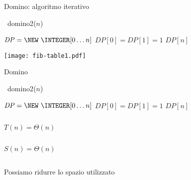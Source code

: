\begin{frame}[fragile]{Domino: algoritmo iterativo}

\vspace{-9pt}

\begin{Procedure}
\caption[A]{\INTEGER\ \textsf{domino2}(\INTEGER $n$)}
  $\mathit{DP} = \NEW\ \INTEGER[0 \ldots n]$\;
  $\mathit{DP}[0] = \mathit{DP}[1] = 1$\;
  \Return $\mathit{DP}[n]$\;
\end{Procedure}

\begin{center}
\texttt{[image: fib-table1.pdf]}
\end{center}

\end{frame}



\begin{frame}[fragile]{Domino}

\vspace{-9pt}
\begin{Procedure}
\caption[A]{\INTEGER\  \textsf{domino2}(\INTEGER $n$)}
  $\mathit{DP} = \NEW\ \INTEGER[0 \ldots n]$\;
  $\mathit{DP}[0] = \mathit{DP}[1] = 1$\;
  \Return $\mathit{DP}[n]$\;
\end{Procedure}

\begin{columns}[T]
\pause
{}
\bigskip
\alert{$T(n) = \Theta(n)$}
\end{columns}

\begin{columns}[T]
\pause
{}
\bigskip
\alert{$S(n) = \Theta(n)$}
\end{columns}

\begin{columns}[T]
\pause
{}
\bigskip
\alert{Possiamo ridurre lo spazio utilizzato}
\end{columns}

\end{frame}

